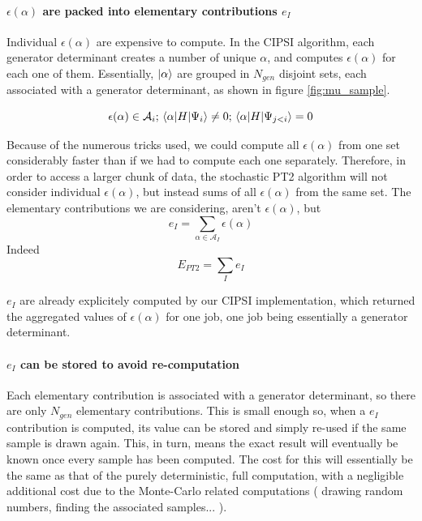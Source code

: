 \documentclass[./thesis.tex]{subfiles}
\begin{document}
\paragraph{$\epsilon(\alpha)$ are packed into elementary contributions $e_I$}
Individual $\epsilon(\alpha)$ are expensive to compute. In the CIPSI algorithm, each generator determinant creates a number of unique $\alpha$, and computes $\epsilon(\alpha)$ for each one of them.
Essentially, $\ket \alpha$ are grouped in $N_{gen}$ disjoint sets, each associated with a generator determinant, as shown in figure \ref{fig:mu_sample}.

	$$\epsilon(\alpha) \in \mathcal{A}_i ; \mel{\alpha}{H}{\Psi_i} \neq 0 ; \mel{\alpha}{H}{\Psi_{j<i}} =0 $$

Because of the numerous tricks used, we could compute all $\epsilon(\alpha)$ from one set considerably faster than if we had to compute each one separately. Therefore, in order to access a larger chunk of data, the stochastic PT2 algorithm will not consider individual $\epsilon(\alpha)$, but instead sums of all $\epsilon(\alpha)$ from the same set.
The elementary contributions we are considering, aren't $\epsilon(\alpha)$, but
	$$e_I = \sum_{\alpha \in \mathcal{A}_I} \epsilon(\alpha)$$
Indeed
    $$E_{PT2} = \sum_{I} e_I$$
    
$e_I$ are already explicitely computed by our CIPSI implementation, which returned the aggregated values of $\epsilon(\alpha)$ for one job, one job being essentially a generator determinant.

\paragraph{$e_I$ can be stored to avoid re-computation}
Each elementary contribution is associated with a generator determinant, so there are only $N_{gen}$ elementary contributions. This is small enough so, when a $e_I$ contribution is computed, its value can be stored and simply re-used if the same sample is drawn again. This, in turn, means the exact result will eventually be known once every sample has been computed. The cost for this will essentially be the same as that of the purely deterministic, full computation, with a negligible additional cost due to the Monte-Carlo related computations ( drawing random numbers, finding the associated samples... ).
\end{document}
